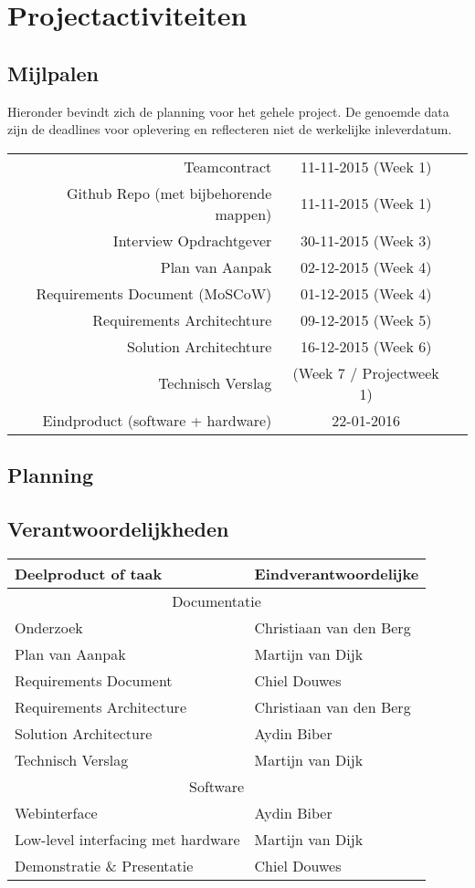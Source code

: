 \chapter{Projectactiviteiten}
\section{Mijlpalen}
Hieronder bevindt zich de planning voor het gehele project. De genoemde data zijn de deadlines voor oplevering en reflecteren niet de werkelijke inleverdatum.

\begin{tabular}{ r | c r }
  Teamcontract & 11-11-2015 (Week 1) \\
  Github Repo (met bijbehorende mappen) & 11-11-2015 (Week 1) \\
  Interview Opdrachtgever & 30-11-2015 (Week 3) \\
  Plan van Aanpak & 02-12-2015 (Week 4) \\
  Requirements Document (MoSCoW) & 01-12-2015 (Week 4) \\
  Requirements Architechture &  09-12-2015 (Week 5) \\
  Solution Architechture & 16-12-2015 (Week 6) \\
  Technisch Verslag	& (Week 7 / Projectweek 1) \\
  Eindproduct (software + hardware)	& 22-01-2016 \\
\end{tabular}

\section{Planning}


\section{Verantwoordelijkheden}
\begin{tabular}{ p{5cm} | l }
\textbf{Deelproduct of taak} & \textbf{Eindverantwoordelijke}\\
\hline
\multicolumn{2}{c}{Documentatie}\\
\hline
Onderzoek & Christiaan van den Berg \\
Plan van Aanpak & Martijn van Dijk \\
Requirements Document & Chiel Douwes \\
Requirements Architecture & Christiaan van den Berg \\
Solution Architecture & Aydin Biber \\
Technisch Verslag & Martijn van Dijk \\
\hline
\multicolumn{2}{c}{Software}\\
\hline
Webinterface & Aydin Biber\\
Low-level interfacing met hardware & Martijn van Dijk\\
Demonstratie \& Presentatie & Chiel Douwes \\
\end{tabular}